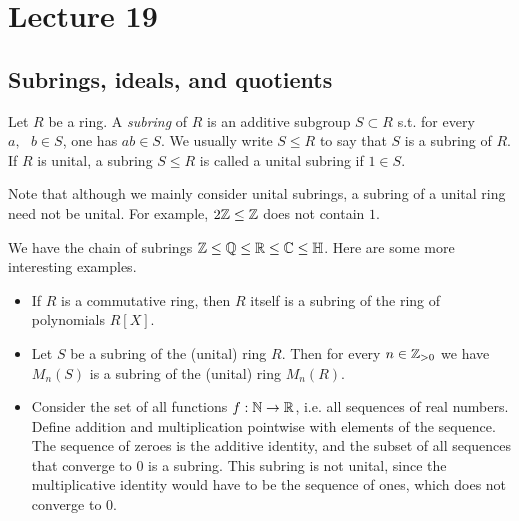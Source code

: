 \section{Lecture 19}
\subsection{Subrings, ideals, and quotients}
\begin{definition}
  Let $R$ be a ring. A \emph{subring} of $R$ is an additive subgroup $S\subset R$ s.t. for every
  $a,\text{ } b\in S$, one has $ab\in S$. We usually write $S\leq R$ to say that $S$ is a subring of $R$. If $R$ is unital, a subring $S\leq R$ is called a unital subring if $1\in S$. 
  \label{<+label+>}
\end{definition}
\begin{remark}
    Note that although we mainly consider unital subrings, a subring of a unital ring need not be unital. For example, 
    $2\mathbb Z \leq \mathbb Z$ does not contain $1$.
\end{remark}


\begin{example}
    We have the chain of subrings $\mathbb Z \leq \mathbb Q \leq \mathbb R \leq \mathbb C \leq \mathbb H$. Here are some more interesting examples.
    \begin{itemize}
        \item If $R$ is a commutative ring, then $R$ itself is a
  subring of the ring of polynomials $R[X].$
        \item Let $S$ be a subring of the (unital) ring $R$. Then for every $n\in\mathbb Z_{>0}$ we have $M_{n}(S)$ is a subring of the (unital) ring $M_{n}(R)$.
        \item Consider the set of all functions $f:\mathbb N\to\mathbb R$, i.e. all sequences of real numbers. %
        Define addition and multiplication pointwise with elements of the sequence. The sequence of zeroes is the additive identity, and the subset of all sequences that converge to $0$ is a subring. This subring is not unital, since the multiplicative identity would have to be the sequence of ones, which does not converge to $0$.
    \end{itemize} 

\end{example}


